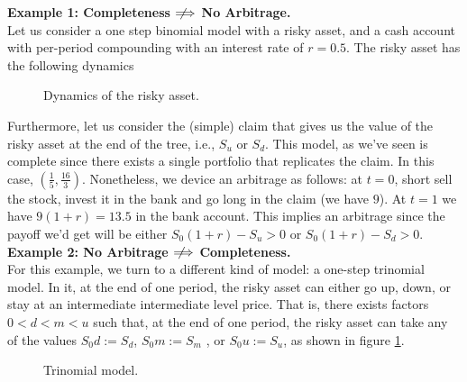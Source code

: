 \documentclass[../TGMAFFIRO.tex]{subfiles}
\begin{document}
\textbf{Example 1: Completeness $\notimplies$ No Arbitrage.}\\
Let us consider a one step binomial model with a risky asset, and a cash account with per-period compounding with an interest rate of $r=0.5$. The risky asset has the following dynamics

\begin{figure}[h!]
\centering
{}
\caption{Dynamics of the risky asset.}
\end{figure}

Furthermore, let us consider the (simple) claim that gives us the value of the risky asset at the end of the tree, i.e., $S_u$ or $S_d$. This model, as we've seen is complete since there exists a single portfolio that replicates the claim. In this case, $(\frac{1}{5}, \frac{16}{3})$. Nonetheless, we device an arbitrage as follows: at $t=0$, short sell the stock, invest it in the bank and go long in the claim (we have $9$). At $t=1$ we have $9(1 + r) = 13.5$ in the bank account. This implies an arbitrage since the payoff we'd get will be either $S_0(1 + r) - S_u > 0$ or $S_0(1 + r) - S_d > 0$.\\

\textbf{Example 2: No Arbitrage $\notimplies$ Completeness.}\\
For this example, we turn to a different kind of model: a one-step trinomial model. In it, at the end of one period, the risky asset can either go up, down, or stay at an intermediate intermediate level price. That is, there exists factors $0 < d < m < u$ such that, at the end of one period, the risky asset can take any of the values $S_0 d := S_d$, $S_0 m := S_m$ , or $S_0 u := S_u$, as shown in figure \ref{fig:trinomial_model}.

\begin{figure}[h!]
\centering
{}
\caption{Trinomial model.}
\label{fig:trinomial_model}
\end{figure}
\end{document}
